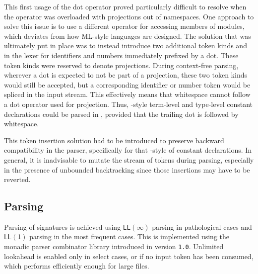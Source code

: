 This first usage of the dot operator proved particularly difficult to resolve when the operator was overloaded with projections out of namespaces.
One approach to solve this issue is to use a different operator for accessing members of modules, which deviates from how \textsc{ML}-style languages are designed.
The solution that was ultimately put in place was to instead introduce two additional token kinds  and  in the lexer for identifiers and numbers immediately prefixed by a dot.
These token kinds were reserved to denote projections.
During context-free parsing, wherever a dot is expected to not be part of a projection, these two token kinds would still be accepted, but a corresponding identifier or number token would be spliced in the input stream.
This effectively means that whitespace cannot follow a dot operator used for projection.
Thus, \Twelf-style \LF term-level and type-level constant declarations could be parsed in \Beluga, provided that the trailing dot is followed by whitespace.

This token insertion solution had to be introduced to preserve backward compatibility in the parser, specifically for that \Twelf-style of constant declarations.
In general, it is inadvisable to mutate the stream of tokens during parsing, especially in the presence of unbounded backtracking since those insertions may have to be reverted.

\subsection{Parsing}

Parsing of \Beluga signatures is achieved using $ \mathsf{LL(\infty)} $ parsing in pathological cases and $ \mathsf{LL(1)} $ parsing in the most frequent cases.
This is implemented using the monadic parser combinator library introduced in \Beluga version \texttt{1.0}.
Unlimited lookahead is enabled only in select cases, or if no input token has been consumed, which performs efficiently enough for large \Beluga files.

